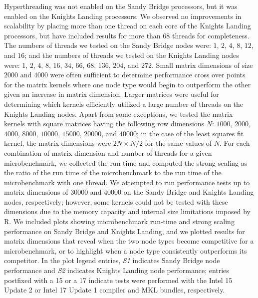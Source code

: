 Hyperthreading was not enabled on the Sandy Bridge processors, but it was
  enabled on the Knights Landing processors.
We observed no improvements in scalability by placing more than one thread on
  each core of the Knights Landing processors, but have included results for
  more than 68 threads for completeness.
The numbers of threads we tested on the Sandy Bridge nodes were:
  $1$, $2$, $4$, $8$, $12$, and $16$; and the numbers of threads we tested on
  the Knights Landing nodes were:
  $1$, $2$, $4$, $8$, $16$, $34$, $66$, $68$, $136$, $204$, and $272$.
Small matrix dimensions of size $2000$ and $4000$ were often sufficient to
  determine performance cross over points for the matrix kernels where one
  node type would begin to outperform the other given an increase in matrix
  dimension.
Larger matrices were useful for determining which kernels efficiently utilized a
  large number of threads on the Knights Landing nodes.
Apart from some exceptions, we tested the matrix kernels with
  square matrices having the following row dimensions $N$:
  $1000$, $2000$, $4000$, $8000$, $10000$, $15000$, $20000$, and $40000$; in the
  case of the least squares fit kernel, the matrix dimensions were
  $2N \times N/2$ for the same values of $N$.
For each combination of matrix dimension and number of threads for a given
  microbenchmark, we collected the run time and computed the strong scaling as
  the ratio of the run time of the microbenchmark to the run time of the
  microbenchmark with one thread.
We attempted to run performance tests up to matrix dimensions of $30000$ and
  $40000$ on the Sandy Bridge and Knights Landing nodes, respectively; however,
  some kernels could not be tested with these dimensions due to the memory
  capacity and internal size limitations imposed by R.
We included plots showing microbenchmark run-time and strong scaling performance
  on Sandy Bridge and Knights Landing, and we plotted results for
  matrix dimensions that reveal when the two node types become competitive for
  a microbenchmark, or to highlight when a node type consistently outperforms
  its competitor.
In the plot legend entries, \textit{S1} indicates Sandy Bridge node performance
  and \textit{S2} indicates Knights Landing node performance; entries postfixed
  with a 15 or a 17 indicate tests were performed with the Intel 15 Update 2 or
  Intel 17 Update 1 compiler and MKL bundles, respectively.

